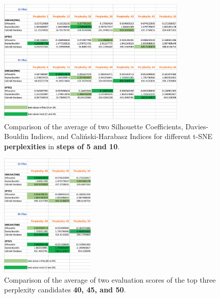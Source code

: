 \begin{figure}[H]
  \centering
  \includegraphics[width=0.8\textwidth]{./images/tsneParametersTest/perplexity/perplexityEvaluationScoresAverage.png}
  \caption{Comparison of the average of two Silhouette Coefficients, Davies-Bouldin Indices, and Caliński-Harabasz Indices for different t-SNE \textbf{perplexities} in \textbf{steps of 5 and 10}.}
  \label{figure:perplexityEvaluationScoresAverage}
\end{figure}

\begin{figure}[H]
  \centering
  \includegraphics[width=0.4\textwidth]{./images/tsneParametersTest/perplexity/perplexityEvaluationScoresDetailedAverage.png}
  \caption{Comparison of the average of two evaluation scores of the top three perplexity candidates \textbf{40, 45, and 50}.}
  \label{figure:perplexityEvaluationScoresDetailedAverage}
\end{figure}


\clearpage